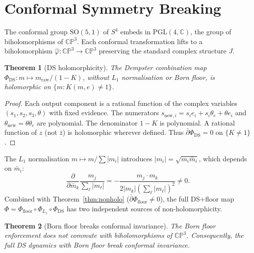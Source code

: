 \documentclass[11pt,a4paper]{article}
\newtheorem{theorem}{Theorem}[section]
\theoremstyle{definition}
\theoremstyle{remark}
\newcommand{\CP}{\mathbb{CP}}
\newcommand{\C}{\mathbb{C}}
\newcommand{\dbar}{\bar{\partial}}
\begin{document}
\section{Conformal Symmetry Breaking}\label{sec:conformal}

The conformal group $\mathrm{SO}(5,1)$ of $S^4$ embeds in $\mathrm{PGL}(4,\C)$, the group of biholomorphisms of $\CP^3$. Each conformal transformation lifts to a biholomorphism $\hat\varphi:\CP^3\to\CP^3$ preserving the standard complex structure $J$.

\begin{theorem}[DS holomorphicity]\label{thm:ds_holo}
The Dempster combination map $\Phi_{\mathrm{DS}}:m\mapsto m_{\mathrm{raw}}/(1-K)$, without $L_1$ normalisation or Born floor, is holomorphic on $\{m:K(m,e)\neq 1\}$.
\end{theorem}

\begin{proof}
Each output component is a rational function of the complex variables $(s_1,s_2,s_3,\theta)$ with fixed evidence. The numerators $s_{\mathrm{new},i}=s_ie_i+s_i\theta_e+\theta e_i$ and $\theta_{\mathrm{new}}=\theta\theta_e$ are polynomial. The denominator $1-K$ is polynomial. A rational function of $z$ (not $\bar{z}$) is holomorphic wherever defined. Thus $\dbar\Phi_{\mathrm{DS}}=0$ on $\{K\neq 1\}$.
\end{proof}

The $L_1$ normalisation $m\mapsto m/\sum|m_i|$ introduces $|m_i|=\sqrt{m_i\bar{m}_i}$, which depends on $\bar{m}_i$:
\begin{equation}
\frac{\partial}{\partial\bar{m}_k}\frac{m_j}{\sum_\ell|m_\ell|}=-\frac{m_j\cdot m_k}{2|m_k|\left(\sum_\ell|m_\ell|\right)^2}\neq 0.
\end{equation}
Combined with Theorem~\ref{thm:nonholo} ($\dbar\Phi_{\mathrm{floor}}\neq 0$), the full DS+floor map $\Phi=\Phi_{\mathrm{floor}}\circ\Phi_{L_1}\circ\Phi_{\mathrm{DS}}$ has two independent sources of non-holomorphicity.

\begin{theorem}[Born floor breaks conformal invariance]\label{thm:conformal_break}
The Born floor enforcement does not commute with biholomorphisms of $\CP^3$. Consequently, the full DS dynamics with Born floor break conformal invariance.
\end{theorem}
\end{document}
